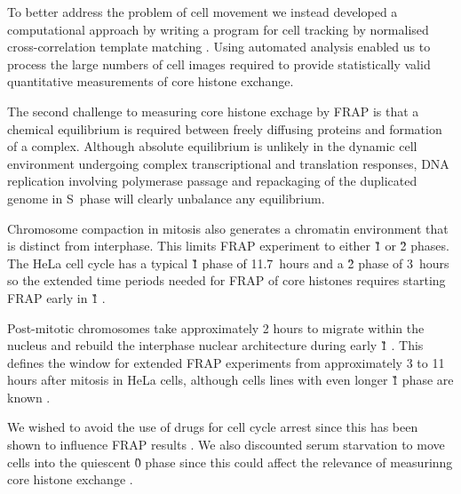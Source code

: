     To better address the problem of cell movement we instead developed a computational approach
    by writing a program for cell tracking by normalised cross-correlation template matching  .
    Using automated analysis enabled us to process the large numbers of cell images 
    required to provide statistically valid quantitative measurements of core histone exchange.


    The second challenge to measuring core histone exchage by FRAP is that
    a chemical equilibrium is required between freely diffusing proteins and 
    formation of a complex. Although absolute equilibrium is unlikely 
    in the dynamic cell environment undergoing complex transcriptional and translation responses,
    DNA replication involving polymerase passage and repackaging of the duplicated genome
    in S~phase will clearly unbalance any equilibrium.

    Chromosome compaction in mitosis also generates a chromatin environment
    that is distinct from interphase.
    This limits FRAP experiment to either \G1{} or \G2{} phases.
    The HeLa cell cycle has a typical \G1{} phase of 11.7~hours and a \G2{} phase of 3~hours \citep{HeLaCellCycle}
    so the extended time periods needed for FRAP of core histones requires
    starting FRAP early in \G1{} .

    Post-mitotic chromosomes take approximately 2 hours to migrate within the nucleus 
    and rebuild the interphase nuclear architecture during early \G1{}
    \citep{visualizationG1chromosomes,earlyg1position,RelativeChromosomePosition}.
    This defines the window for extended FRAP experiments from approximately 3 to 11 hours after mitosis
    in HeLa cells, although cells lines with even longer \G1{} phase are known \citep{PancreaticCells}.

    We wished to avoid the use of drugs for cell cycle arrest since this has been
    shown to influence FRAP results \addref{}. 
    We also discounted serum starvation to move cells into the
    quiescent \G0{} phase since this could affect 
    the relevance of measurinng core histone exchange \citep{SerumStarvation} .

